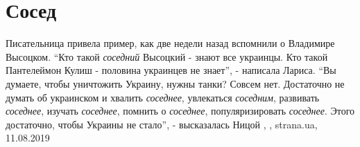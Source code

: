  
 
 
 
 
\chapter{Сосед}

Писательница привела пример, как две недели назад вспомнили о Владимире
Высоцком. \enquote{Кто такой \emph{соседний} Высоцкий - знают все украинцы. Кто
такой Пантелеймон Кулиш - половина украинцев не знает}, - написала Лариса.
\enquote{Вы думаете, чтобы уничтожить Украину, нужны танки? Совсем нет.
Достаточно не думать об украинском и хвалить \emph{соседнее}, увлекаться
\emph{соседним}, развивать \emph{соседнее}, изучать \emph{соседнее}, помнить о
\emph{соседнее}, популяризировать \emph{соседнее}.  Этого достаточно, чтобы
Украины не стало}, - высказалась Ницой
, , strana.ua, 11.08.2019

